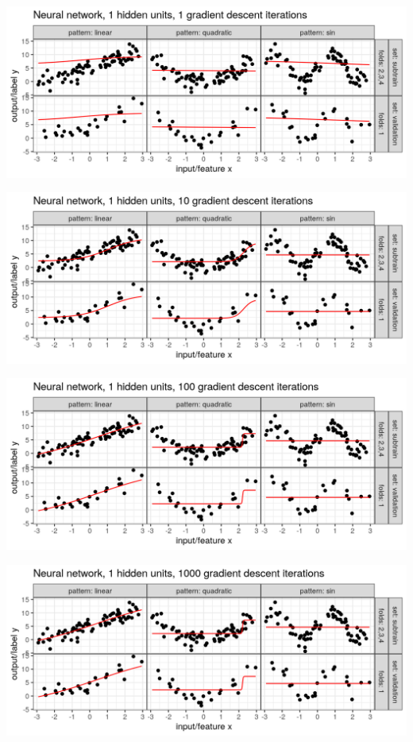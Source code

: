 
\begin{frame}
  \includegraphics[width=\textwidth]{figure-overfitting-pred-units=1-maxit=1.png}
\end{frame}


\begin{frame}
  \includegraphics[width=\textwidth]{figure-overfitting-pred-units=1-maxit=10.png}
\end{frame}


\begin{frame}
  \includegraphics[width=\textwidth]{figure-overfitting-pred-units=1-maxit=100.png}
\end{frame}


\begin{frame}
  \includegraphics[width=\textwidth]{figure-overfitting-pred-units=1-maxit=1000.png}
\end{frame}


